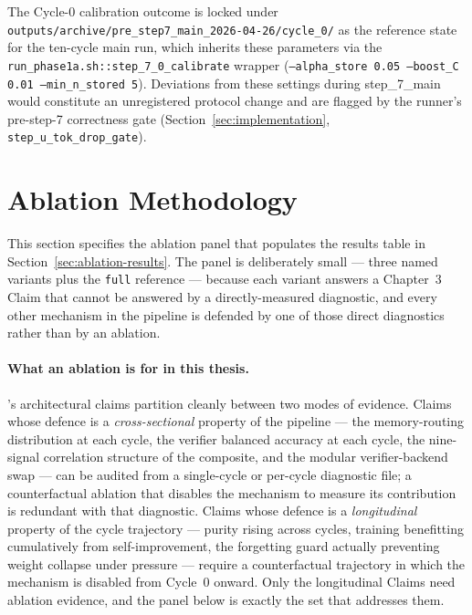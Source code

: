 The Cycle-0 calibration outcome is locked under \texttt{outputs/archive/pre\_step7\_main\_2026-04-26/cycle\_0/} as the reference state for the ten-cycle main run, which inherits these parameters via the \texttt{run\_phase1a.sh::step\_7\_0\_calibrate} wrapper (\texttt{--alpha\_store 0.05 --boost\_C 0.01 --min\_n\_stored 5}). Deviations from these settings during step\_7\_main would constitute an unregistered protocol change and are flagged by the runner's pre-step-7 correctness gate (Section~\ref{sec:implementation}, \texttt{step\_u\_tok\_drop\_gate}).

\section{Ablation Methodology}
\label{sec:ablation}

This section specifies the ablation panel that populates the results table in Section~\ref{sec:ablation-results}. The panel is deliberately small --- three named variants plus the \texttt{full} reference --- because each variant answers a Chapter~3 Claim that cannot be answered by a directly-measured diagnostic, and every other mechanism in the pipeline is defended by one of those direct diagnostics rather than by an ablation.

\paragraph{What an ablation is for in this thesis.}
\caem{}'s architectural claims partition cleanly between two modes of evidence. Claims whose defence is a \emph{cross-sectional} property of the pipeline --- the memory-routing distribution at each cycle, the verifier balanced accuracy at each cycle, the nine-signal correlation structure of the composite, and the modular verifier-backend swap --- can be audited from a single-cycle or per-cycle diagnostic file; a counterfactual ablation that disables the mechanism to measure its contribution is redundant with that diagnostic. Claims whose defence is a \emph{longitudinal} property of the cycle trajectory --- purity rising across cycles, training benefitting cumulatively from self-improvement, the forgetting guard actually preventing weight collapse under pressure --- require a counterfactual trajectory in which the mechanism is disabled from Cycle~0 onward. Only the longitudinal Claims need ablation evidence, and the panel below is exactly the set that addresses them.

